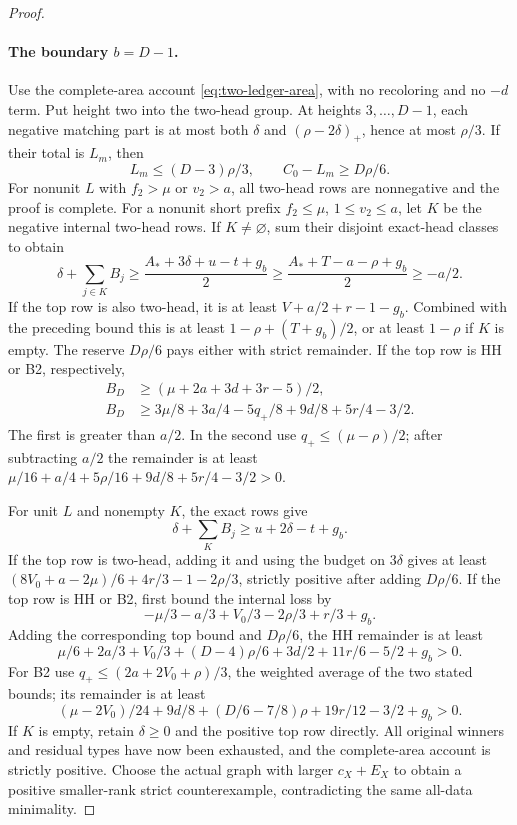 \documentclass[11pt,a4paper]{article}
\theoremstyle{definition}
\begin{document}
\begin{proof}
\paragraph{The boundary $b=D-1$.}
Use the complete-area account \eqref{eq:two-ledger-area}, with no recoloring and no $-d$ term. Put height two into the two-head group. At heights $3,\ldots,D-1$, each negative matching part is at most both $\delta$ and $(\rho-2\delta)_+$, hence at most $\rho/3$. If their total is $L_m$, then
\[
L_m\le(D-3)\rho/3,\qquad C_0-L_m\ge D\rho/6.
\]
For nonunit $L$ with $f_2>\mu$ or $v_2>a$, all two-head rows are nonnegative and the proof is complete. For a nonunit short prefix $f_2\le\mu$, $1\le v_2\le a$, let $K$ be the negative internal two-head rows. If $K\ne\varnothing$, sum their disjoint exact-head classes to obtain
\[
\delta+\sum_{j\in K}B_j
\ge\frac{A_*+3\delta+u-t+g_b}{2}
\ge\frac{A_*+T-a-\rho+g_b}{2}\ge-a/2.
\]
If the top row is also two-head, it is at least $V+a/2+r-1-g_b$. Combined with the preceding bound this is at least $1-\rho+(T+g_b)/2$, or at least $1-\rho$ if $K$ is empty. The reserve $D\rho/6$ pays either with strict remainder. If the top row is HH or B2, respectively,
\begin{align*}
B_D&\ge(\mu+2a+3d+3r-5)/2,\\
B_D&\ge3\mu/8+3a/4-5q_+/8+9d/8+5r/4-3/2.
\end{align*}
The first is greater than $a/2$. In the second use $q_+\le(\mu-\rho)/2$; after subtracting $a/2$ the remainder is at least $\mu/16+a/4+5\rho/16+9d/8+5r/4-3/2>0$.

For unit $L$ and nonempty $K$, the exact rows give
\[
\delta+\sum_KB_j\ge u+2\delta-t+g_b.
\]
If the top row is two-head, adding it and using the budget on $3\delta$ gives at least $(8V_0+a-2\mu)/6+4r/3-1-2\rho/3$, strictly positive after adding $D\rho/6$. If the top row is HH or B2, first bound the internal loss by
\[
-\mu/3-a/3+V_0/3-2\rho/3+r/3+g_b.
\]
Adding the corresponding top bound and $D\rho/6$, the HH remainder is at least
\[
\mu/6+2a/3+V_0/3+(D-4)\rho/6+3d/2+11r/6-5/2+g_b>0.
\]
For B2 use $q_+\le(2a+2V_0+\rho)/3$, the weighted average of the two stated bounds; its remainder is at least
\[
(\mu-2V_0)/24+9d/8+(D/6-7/8)\rho+19r/12-3/2+g_b>0.
\]
If $K$ is empty, retain $\delta\ge0$ and the positive top row directly. All original winners and residual types have now been exhausted, and the complete-area account is strictly positive. Choose the actual graph with larger $c_X+E_X$ to obtain a positive smaller-rank strict counterexample, contradicting the same all-data minimality.
\end{proof}
\end{document}
